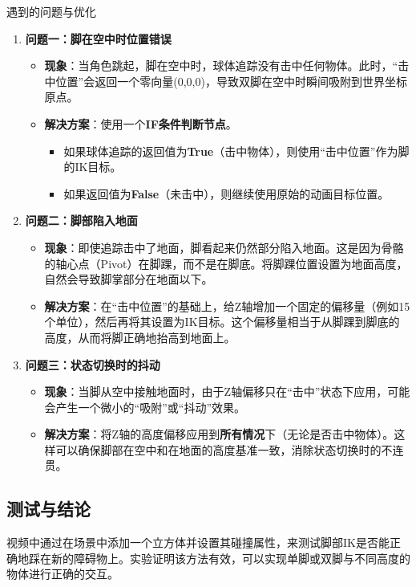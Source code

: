 \documentclass[math,code,12pt]{amznotes}
\begin{document}
    \begin{genbox}{遇到的问题与优化}
    \begin{enumerate}
        \item \textbf{问题一：脚在空中时位置错误}
        \begin{itemize}
            \item \textbf{现象}：当角色跳起，脚在空中时，球体追踪没有击中任何物体。此时，“击中位置”会返回一个零向量(0,0,0)，导致双脚在空中时瞬间吸附到世界坐标原点。
            \item \textbf{解决方案}：使用一个\textbf{IF条件判断节点}。
            \begin{itemize}
                \item 如果球体追踪的返回值为\textbf{True}（击中物体），则使用“击中位置”作为脚的IK目标。
                \item 如果返回值为\textbf{False}（未击中），则继续使用原始的动画目标位置。
            \end{itemize}
        \end{itemize}
    
        \item \textbf{问题二：脚部陷入地面}
        \begin{itemize}
            \item \textbf{现象}：即使追踪击中了地面，脚看起来仍然部分陷入地面。这是因为骨骼的轴心点（Pivot）在脚踝，而不是在脚底。将脚踝位置设置为地面高度，自然会导致脚掌部分在地面以下。
            \item \textbf{解决方案}：在“击中位置”的基础上，给Z轴增加一个固定的偏移量（例如15个单位），然后再将其设置为IK目标。这个偏移量相当于从脚踝到脚底的高度，从而将脚正确地抬高到地面上。
        \end{itemize}
    
        \item \textbf{问题三：状态切换时的抖动}
        \begin{itemize}
            \item \textbf{现象}：当脚从空中接触地面时，由于Z轴偏移只在“击中”状态下应用，可能会产生一个微小的“吸附”或“抖动”效果。
            \item \textbf{解决方案}：将Z轴的高度偏移应用到\textbf{所有情况}下（无论是否击中物体）。这样可以确保脚部在空中和在地面的高度基准一致，消除状态切换时的不连贯。
        \end{itemize}
    \end{enumerate}
    \end{genbox}
    \subsection{测试与结论}
    视频中通过在场景中添加一个立方体并设置其碰撞属性，来测试脚部IK是否能正确地踩在新的障碍物上。实验证明该方法有效，可以实现单脚或双脚与不同高度的物体进行正确的交互。
    
\end{document}
